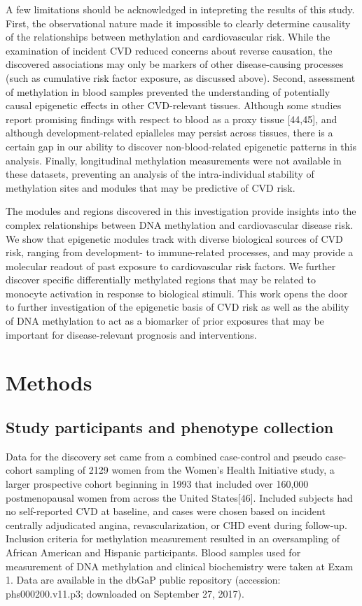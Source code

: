 \documentclass[]{article}
\theoremstyle{definition}
\theoremstyle{definition}
\theoremstyle{definition}
\theoremstyle{remark}
\begin{document}
A few limitations should be acknowledged in intepreting the results of
this study. First, the observational nature made it impossible to
clearly determine causality of the relationships between methylation and
cardiovascular risk. While the examination of incident CVD reduced
concerns about reverse causation, the discovered associations may only
be markers of other disease-causing processes (such as cumulative risk
factor exposure, as discussed above). Second, assessment of methylation
in blood samples prevented the understanding of potentially causal
epigenetic effects in other CVD-relevant tissues. Although some studies
report promising findings with respect to blood as a proxy tissue
{[}44,45{]}, and although development-related epialleles may persist
across tissues, there is a certain gap in our ability to discover
non-blood-related epigenetic patterns in this analysis. Finally,
longitudinal methylation measurements were not available in these
datasets, preventing an analysis of the intra-individual stability of
methylation sites and modules that may be predictive of CVD risk.

The modules and regions discovered in this investigation provide
insights into the complex relationships between DNA methylation and
cardiovascular disease risk. We show that epigenetic modules track with
diverse biological sources of CVD risk, ranging from development- to
immune-related processes, and may provide a molecular readout of past
exposure to cardiovascular risk factors. We further discover specific
differentially methylated regions that may be related to monocyte
activation in response to biological stimuli. This work opens the door
to further investigation of the epigenetic basis of CVD risk as well as
the ability of DNA methylation to act as a biomarker of prior exposures
that may be important for disease-relevant prognosis and interventions.

\section{Methods}\label{methods}

\subsection{Study participants and phenotype
collection}\label{study-participants-and-phenotype-collection}

Data for the discovery set came from a combined case-control and pseudo
case-cohort sampling of 2129 women from the Women's Health Initiative
study, a larger prospective cohort beginning in 1993 that included over
160,000 postmenopausal women from across the United States{[}46{]}.
Included subjects had no self-reported CVD at baseline, and cases were
chosen based on incident centrally adjudicated angina,
revascularization, or CHD event during follow-up. Inclusion criteria for
methylation measurement resulted in an oversampling of African American
and Hispanic participants. Blood samples used for measurement of DNA
methylation and clinical biochemistry were taken at Exam 1. Data are
available in the dbGaP public repository (accession: phs000200.v11.p3;
downloaded on September 27, 2017).
\end{document}
